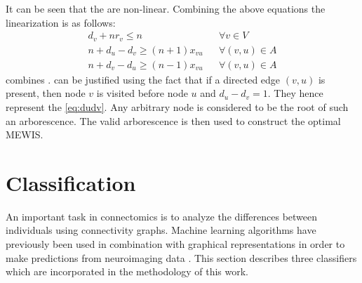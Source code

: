 \documentclass[msthesis.tex]{subfiles}
\begin{document}
It can be seen that the  are non-linear. Combining the above equations the linearization is as follows:
\begin{align}
    \label{eq:dvlin}
    d_v + n r_v \leq n && \forall v \in V\\
    \label{eq:nuvlin}
    n + d_u - d_v \geq (n+1) x_{vu} && \forall (v,u) \in A\\
    \label{eq:dvdulin}
    n + d_v - d_u \geq (n-1) x_{vu} && \forall (v,u) \in A
\end{align}
 combines .  can be justified using the fact that if a directed edge $(v,u)$ is present, then node $v$ is visited before node $u$ and $d_u - d_v = 1$. They hence represent the \cref{eq:dudv}.
Any arbitrary node is considered to be the root of such an arborescence. The valid arborescence is then used to construct the optimal \gls{MEWIS}.

\section{Classification}
An important task in connectomics is to analyze the differences between individuals using connectivity graphs. Machine learning algorithms have previously been used in combination with graphical representations in order to make predictions from neuroimaging data \citep{casanova2012combining}. This section describes three classifiers which are incorporated in the methodology of this work. 
\end{document}

